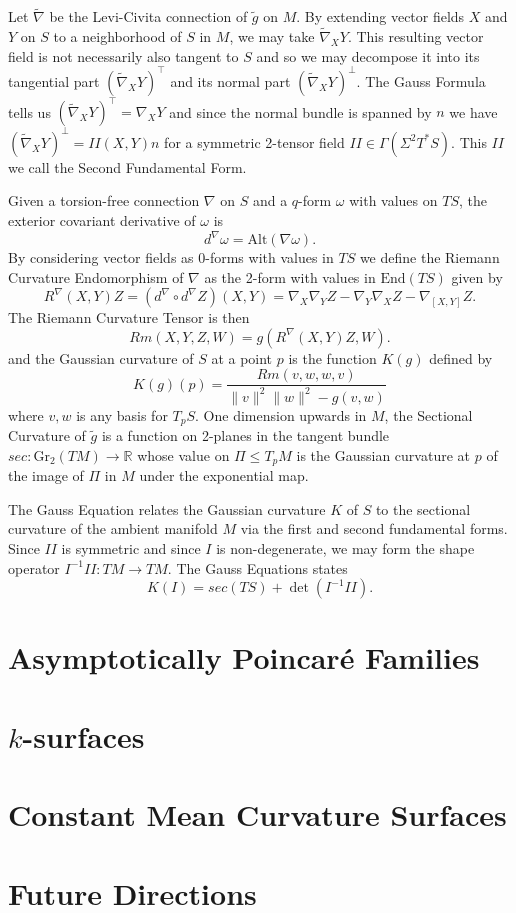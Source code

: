 \documentclass{amsart}
\newcommand{\R}{\mathbb{R}}
\newcommand{\two}{I\!\!I}
\begin{document}
Let $\widetilde{\nabla}$ be the Levi-Civita connection of $\tilde{g}$ on $M$.
By extending vector fields $X$ and $Y$ on $S$ to a neighborhood of $S$ in $M$, we may take $\widetilde{\nabla}_X Y$.
This resulting vector field is not necessarily also tangent to $S$ and so we may decompose it into its tangential part $(\widetilde{\nabla}_X Y)^\top$ and its normal part $(\widetilde{\nabla}_X Y)^\perp$.
The Gauss Formula tells us $(\widetilde{\nabla}_X Y)^\top = \nabla_X Y$ and since the normal bundle is spanned by $n$ we have $(\widetilde{\nabla}_X Y)^\perp = \two(X,Y)n$ for a symmetric 2-tensor field $\two \in \Gamma(\Sigma^2T^*S)$.
This $\two$ we call the Second Fundamental Form.

 
Given a torsion-free connection $\nabla$ on $S$ and a $q$-form $\omega$ with values on $TS$, the exterior covariant derivative of $\omega$ is 
\[
d^\nabla \omega = \mathrm{Alt}(\nabla \omega).
\]
By considering vector fields as 0-forms with values in $TS$ we define the Riemann Curvature Endomorphism of $\nabla$ as the 2-form with values in $\mathrm{End}(TS)$ given by  
\[
R^{\nabla}(X,Y)Z 
= (d^\nabla \circ d^\nabla Z)(X,Y)
= \nabla_X \nabla_Y Z - \nabla_Y \nabla_X Z - \nabla_{[X,Y]}Z.
\]
The Riemann Curvature Tensor is then 
\[
Rm(X,Y,Z,W) = g(R^{\nabla}(X,Y)Z,W).
\]
and the Gaussian curvature of $S$ at a point $p$ is the function $K(g)$ defined by 
\[
K(g)(p) = \frac{Rm(v,w,w,v)}{\|v\|^2\|w\|^2 - g(v,w)}
\]
where $v,w$ is any basis for $T_pS$.
One dimension upwards in $M$, the Sectional Curvature of $\tilde{g}$ is a function on 2-planes in the tangent bundle $sec: \mathrm{Gr}_2(TM) \to \R$ whose value on $\Pi \leq T_pM$ is the Gaussian curvature at $p$ of the image of $\Pi$ in $M$ under the exponential map.

The Gauss Equation relates the Gaussian curvature $K$ of $S$ to the sectional curvature of the ambient manifold $M$ via the first and second fundamental forms.
Since $\two$ is symmetric and since $I$ is non-degenerate, we may form the shape operator $I^{-1}\two: TM \to TM$.
The Gauss Equations states
\[
K(I) = sec(TS) + \det(I^{-1}\two).
\]








\section{Asymptotically Poincar\'e Families}

\section{$k$-surfaces}

\section{Constant Mean Curvature Surfaces}

\section{Future Directions}
\end{document}
